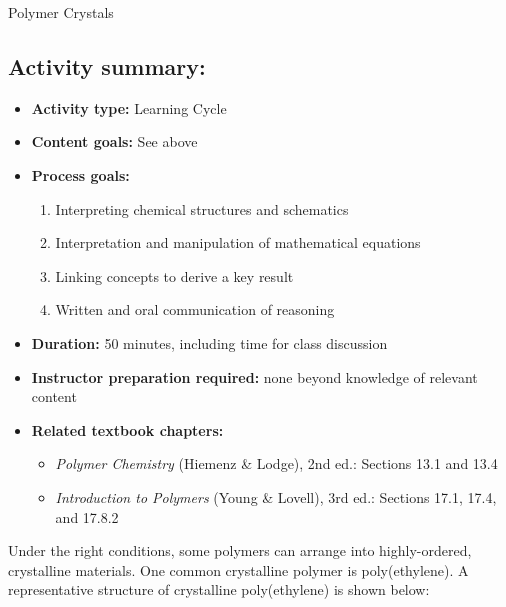 \begin{activity}{Polymer Crystals}
\begin{instructornotes}
	\subsection*{Activity summary:}
	\begin{itemize}
		\item \textbf{Activity type:} Learning Cycle
		\item \textbf{Content goals:} See above %
		\item \textbf{Process goals:} %
			\begin{enumerate}
				\item Interpreting chemical structures and schematics
				\item Interpretation and manipulation of mathematical equations
				\item Linking concepts to derive a key result
				\item Written and oral communication of reasoning
			\end{enumerate}
		\item \textbf{Duration:} 50 minutes, including time for class discussion
		\item \textbf{Instructor preparation required:} none beyond knowledge of relevant content
		\item \textbf{Related textbook chapters:}
			\begin{itemize}
				\item \emph{Polymer Chemistry} (Hiemenz \& Lodge), 2nd ed.: Sections 13.1 and 13.4
				\item \emph{Introduction to Polymers} (Young \& Lovell), 3rd ed.: Sections 17.1, 17.4, and 17.8.2
			\end{itemize}
	\end{itemize}
	
\end{instructornotes}


\begin{model}
	\label{\labelbase:mdl:crystalstructs}
	
	Under the right conditions, some polymers can arrange into highly-ordered, crystalline materials. One common crystalline polymer is poly(ethylene).  A representative structure of crystalline poly(ethylene) is shown below:
	

\end{model}
\end{activity}
